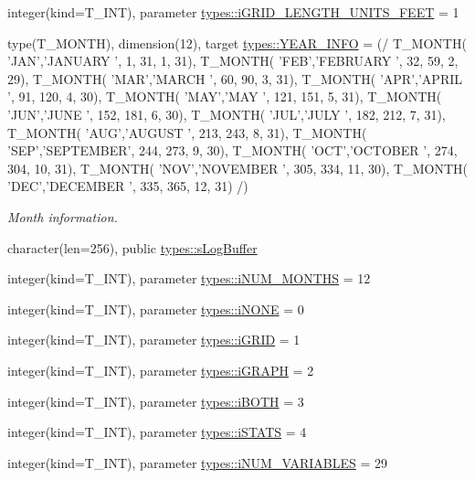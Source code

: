 \begin{DoxyCompactItemize}
integer(kind=T\_\-INT), parameter \hyperlink{namespacetypes_a09fb47af7ad4b30ae025dd1241f3081f}{types::iGRID\_\-LENGTH\_\-UNITS\_\-FEET} = 1
\item 
type(T\_\-MONTH), dimension(12), target \hyperlink{namespacetypes_af6a870221fe362a59d31b23393e431b1}{types::YEAR\_\-INFO} = (/ T\_\-MONTH( 'JAN','JANUARY ', 1, 31, 1, 31), T\_\-MONTH( 'FEB','FEBRUARY ', 32, 59, 2, 29), T\_\-MONTH( 'MAR','MARCH ', 60, 90, 3, 31), T\_\-MONTH( 'APR','APRIL ', 91, 120, 4, 30), T\_\-MONTH( 'MAY','MAY ', 121, 151, 5, 31), T\_\-MONTH( 'JUN','JUNE ', 152, 181, 6, 30), T\_\-MONTH( 'JUL','JULY ', 182, 212, 7, 31), T\_\-MONTH( 'AUG','AUGUST ', 213, 243, 8, 31), T\_\-MONTH( 'SEP','SEPTEMBER', 244, 273, 9, 30), T\_\-MONTH( 'OCT','OCTOBER ', 274, 304, 10, 31), T\_\-MONTH( 'NOV','NOVEMBER ', 305, 334, 11, 30), T\_\-MONTH( 'DEC','DECEMBER ', 335, 365, 12, 31) /)
\begin{DoxyCompactList}\small\item\em Month information. \item\end{DoxyCompactList}\item 
character(len=256), public \hyperlink{namespacetypes_a67706eade7740303d70d3377080a9eb3}{types::sLogBuffer}
\item 
integer(kind=T\_\-INT), parameter \hyperlink{namespacetypes_a3fa6b4fbd911543da65649a0f5ec7ded}{types::iNUM\_\-MONTHS} = 12
\item 
integer(kind=T\_\-INT), parameter \hyperlink{namespacetypes_a000bcd3b779441ad55f9fa83e6522f24}{types::iNONE} = 0
\item 
integer(kind=T\_\-INT), parameter \hyperlink{namespacetypes_a187237a0372eaebca7e88b3c00e0c110}{types::iGRID} = 1
\item 
integer(kind=T\_\-INT), parameter \hyperlink{namespacetypes_a94f1aafe474b6e3e8dc2782d3d84b55f}{types::iGRAPH} = 2
\item 
integer(kind=T\_\-INT), parameter \hyperlink{namespacetypes_acdb6a8e28292f829f0e39938283a434a}{types::iBOTH} = 3
\item 
integer(kind=T\_\-INT), parameter \hyperlink{namespacetypes_af7f37d0a4b61a411aa5759a66973dc62}{types::iSTATS} = 4
\item 
integer(kind=T\_\-INT), parameter \hyperlink{namespacetypes_a9fd35718050c56c63e14d03fb07b62b3}{types::iNUM\_\-VARIABLES} = 29
\item 

\end{DoxyCompactItemize}
